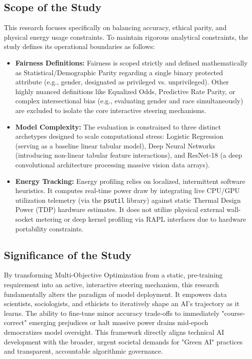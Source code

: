 \documentclass[12pt,a4paper]{article}
\begin{document}
\subsection{Scope of the Study}
This research focuses specifically on balancing accuracy, ethical parity, and physical energy usage constraints. To maintain rigorous analytical constraints, the study defines its operational boundaries as follows:
\begin{itemize}
    \item \textbf{Fairness Definitions:} Fairness is scoped strictly and defined mathematically as Statistical/Demographic Parity regarding a single binary protected attribute (e.g., gender, designated as privileged vs. unprivileged). Other highly nuanced definitions like Equalized Odds, Predictive Rate Parity, or complex intersectional bias (e.g., evaluating gender and race simultaneously) are excluded to isolate the core interactive steering mechanisms.
    \item \textbf{Model Complexity:} The evaluation is constrained to three distinct archetypes designed to scale computational stress: Logistic Regression (serving as a baseline linear tabular model), Deep Neural Networks (introducing non-linear tabular feature interactions), and ResNet-18 (a deep convolutional architecture processing massive vision data arrays).
    \item \textbf{Energy Tracking:} Energy profiling relies on localized, intermittent software heuristics. It computes real-time power draw by integrating live CPU/GPU utilization telemetry (via the \texttt{psutil} library) against static Thermal Design Power (TDP) hardware estimates. It does not utilize physical external wall-socket metering or deep kernel profiling via RAPL interfaces due to hardware portability constraints.
\end{itemize}

\subsection{Significance of the Study}
By transforming Multi-Objective Optimization from a static, pre-training requirement into an active, interactive steering mechanism, this research fundamentally alters the paradigm of model deployment. It empowers data scientists, sociologists, and ethicists to iteratively shape an AI's trajectory as it learns. The ability to fine-tune minor accuracy trade-offs to immediately "course-correct" emerging prejudices or halt massive power drains mid-epoch democratizes model oversight. This framework directly aligns technical AI development with the broader, urgent societal demands for "Green AI" practices and transparent, accountable algorithmic governance.
\end{document}

